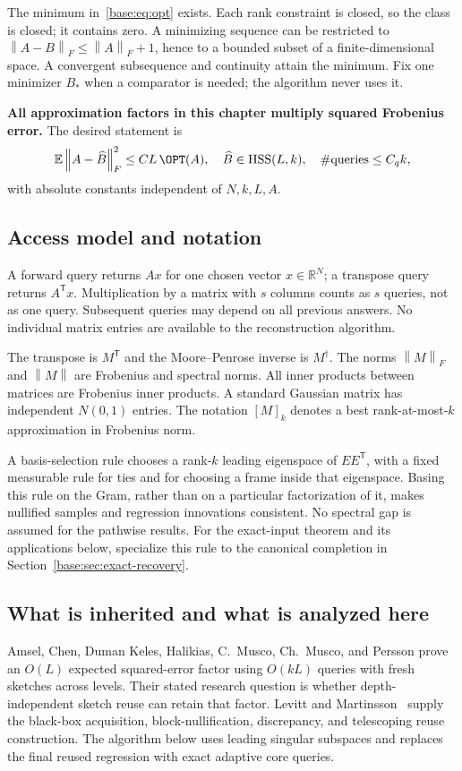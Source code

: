 \documentclass[11pt,oneside,openany,a4paper]{book}
\numberwithin{equation}{chapter}
\theoremstyle{definition}
\theoremstyle{remark}
\newcommand{\R}{\mathbb R}\newcommand{\E}{\mathbb E}\newcommand{\Prb}{\mathbb P}\newcommand{\PP}{\mathbb P}
\newcommand{\T}{\mathsf T}\newcommand{\Id}{I}
\newcommand{\F}[1]{\left\lVert#1\right\rVert_F}
\newcommand{\N}[1]{\left\lVert#1\right\rVert}
\DeclareMathOperator{\HSS}{HSS}\DeclareMathOperator{\dist}{dist}
\begin{document}
The minimum in~\eqref{base:eq:opt} exists. Each rank constraint is closed, so the
class is closed; it contains zero. A minimizing sequence can be restricted
to $\F{A-B}\le\F A+1$, hence to a bounded subset of a finite-dimensional
space. A convergent subsequence and continuity attain the minimum. Fix one
minimizer $B_*$ when a comparator is needed; the algorithm never uses it.

\textbf{All approximation factors in this chapter multiply squared
Frobenius error.} The desired statement is
\begin{equation}\label{base:eq:target}
 \E\F{A-\widehat B}^2\le C L\,\OPT(A),
 \quad \widehat B\in\HSS(L,k),
 \quad \#\text{queries}\le C_qk,
\end{equation}
with absolute constants independent of $N,k,L,A$.

\subsection{Access model and notation}
A forward query returns $Ax$ for one chosen vector $x\in\R^N$; a transpose
query returns $A^{\T} x$. Multiplication by a matrix with $s$ columns counts
as $s$ queries, not as one query. Subsequent queries may depend on all
previous answers. No individual matrix entries are available to the
reconstruction algorithm.

The transpose is $M^{\T}$ and the Moore--Penrose inverse is $M^\dagger$.
The norms $\F M$ and $\N M$ are Frobenius and spectral norms. All inner
products between matrices are Frobenius inner products. A standard Gaussian
matrix has independent $N(0,1)$ entries. The notation $[M]_k$ denotes a best
rank-at-most-$k$ approximation in Frobenius norm.

A basis-selection rule chooses a rank-$k$ leading eigenspace of $EE^{\T}$,
with a fixed measurable rule for ties and for choosing a frame inside that
eigenspace. Basing this rule on the Gram, rather than on a particular
factorization of it, makes nullified samples and regression innovations
consistent. No spectral gap is assumed for the pathwise results. For the
exact-input theorem and its applications below, specialize this rule to
the canonical completion in Section~\ref{base:sec:exact-recovery}.

\subsection{What is inherited and what is analyzed here}
Amsel, Chen, Duman Keles, Halikias, C.~Musco, Ch.~Musco, and Persson
\cite{AmselHSS} prove an $O(L)$ expected squared-error factor using
$O(kL)$ queries with fresh sketches across levels. Their stated research
question is whether depth-independent sketch reuse can retain that factor.
Levitt and Martinsson~\cite{LM} supply the black-box acquisition,
block-nullification, discrepancy, and telescoping reuse construction.
The algorithm below uses leading singular subspaces and replaces the final
reused regression with exact adaptive core queries.
\end{document}
